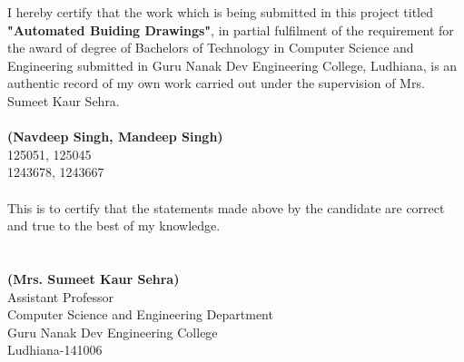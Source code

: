 \begin{Large}
\end{Large}
\vskip 0.1in \noindent I hereby certify that the work which is being submitted in this project titled \textbf{"Automated Buiding Drawings"},
in partial fulfilment of the requirement for the award of degree of Bachelors of Technology in Computer
Science and Engineering submitted in Guru Nanak Dev Engineering College, Ludhiana, is an authentic
record of my own work carried out under the supervision of Mrs. Sumeet Kaur Sehra.\\\\\vskip 0.5in
\noindent\textbf{(Navdeep Singh, Mandeep Singh)}\\
125051, 125045 \\
1243678, 1243667 \\\\\vskip 0.5in
\noindent This is to certify that the statements made above by the candidate are correct and true to the best of my knowledge.\\\\\\
\textbf{(Mrs. Sumeet Kaur Sehra)}\\
Assistant Professor\\
Computer Science and Engineering Department\\
Guru Nanak Dev Engineering College\\
Ludhiana-141006